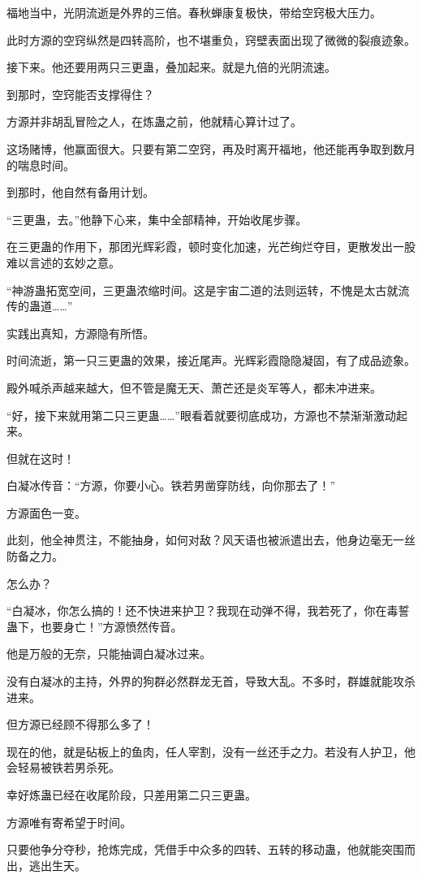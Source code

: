 \begin{this_body}
福地当中，光阴流逝是外界的三倍。春秋蝉康复极快，带给空窍极大压力。

此时方源的空窍纵然是四转高阶，也不堪重负，窍壁表面出现了微微的裂痕迹象。

接下来。他还要用两只三更蛊，叠加起来。就是九倍的光阴流速。

到那时，空窍能否支撑得住？

方源并非胡乱冒险之人，在炼蛊之前，他就精心算计过了。

这场赌博，他赢面很大。只要有第二空窍，再及时离开福地，他还能再争取到数月的喘息时间。

到那时，他自然有备用计划。

“三更蛊，去。”他静下心来，集中全部精神，开始收尾步骤。

在三更蛊的作用下，那团光辉彩霞，顿时变化加速，光芒绚烂夺目，更散发出一股难以言述的玄妙之意。

“神游蛊拓宽空间，三更蛊浓缩时间。这是宇宙二道的法则运转，不愧是太古就流传的蛊道……”

实践出真知，方源隐有所悟。

时间流逝，第一只三更蛊的效果，接近尾声。光辉彩霞隐隐凝固，有了成品迹象。

殿外喊杀声越来越大，但不管是魔无天、萧芒还是炎军等人，都未冲进来。

“好，接下来就用第二只三更蛊……”眼看着就要彻底成功，方源也不禁渐渐激动起来。

但就在这时！

白凝冰传音：“方源，你要小心。铁若男凿穿防线，向你那去了！”

方源面色一变。

此刻，他全神贯注，不能抽身，如何对敌？风天语也被派遣出去，他身边毫无一丝防备之力。

怎么办？

“白凝冰，你怎么搞的！还不快进来护卫？我现在动弹不得，我若死了，你在毒誓蛊下，也要身亡！”方源愤然传音。

他是万般的无奈，只能抽调白凝冰过来。

没有白凝冰的主持，外界的狗群必然群龙无首，导致大乱。不多时，群雄就能攻杀进来。

但方源已经顾不得那么多了！

现在的他，就是砧板上的鱼肉，任人宰割，没有一丝还手之力。若没有人护卫，他会轻易被铁若男杀死。

幸好炼蛊已经在收尾阶段，只差用第二只三更蛊。

方源唯有寄希望于时间。

只要他争分夺秒，抢炼完成，凭借手中众多的四转、五转的移动蛊，他就能突围而出，逃出生天。


\end{this_body}
